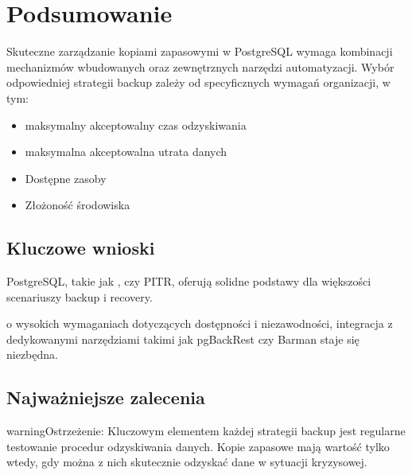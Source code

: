 \documentclass[letterpaper,10pt,polish]{sphinxmanual}
\begin{document}
\section{Podsumowanie}
\label{\detokenize{kopie_zapasowe_i_odzyskiwanie_danych:podsumowanie}}
\sphinxAtStartPar
Skuteczne zarządzanie kopiami zapasowymi w PostgreSQL wymaga kombinacji mechanizmów wbudowanych oraz zewnętrznych narzędzi automatyzacji. Wybór odpowiedniej strategii backup zależy od specyficznych wymagań organizacji, w tym:
\begin{itemize}
\item {} 
\sphinxAtStartPar
{} \sphinxhyphen{} maksymalny akceptowalny czas odzyskiwania

\item {} 
\sphinxAtStartPar
{} \sphinxhyphen{} maksymalna akceptowalna utrata danych

\item {} 
\sphinxAtStartPar
Dostępne zasoby

\item {} 
\sphinxAtStartPar
Złożoność środowiska

\end{itemize}


\subsection{Kluczowe wnioski}
\label{\detokenize{kopie_zapasowe_i_odzyskiwanie_danych:kluczowe-wnioski}}
\sphinxAtStartPar
{} PostgreSQL, takie jak ,  czy PITR, oferują solidne podstawy dla większości scenariuszy backup i recovery.

\sphinxAtStartPar
{} o wysokich wymaganiach dotyczących dostępności i niezawodności, integracja z dedykowanymi narzędziami takimi jak pgBackRest czy Barman staje się niezbędna.


\subsection{Najważniejsze zalecenia}
\label{\detokenize{kopie_zapasowe_i_odzyskiwanie_danych:najwazniejsze-zalecenia}}
\begin{sphinxadmonition}{warning}{Ostrzeżenie:}
\sphinxAtStartPar
Kluczowym elementem każdej strategii backup jest regularne testowanie procedur odzyskiwania danych. Kopie zapasowe mają wartość tylko wtedy, gdy można z nich skutecznie odzyskać dane w sytuacji kryzysowej.
\end{sphinxadmonition}
\end{document}
